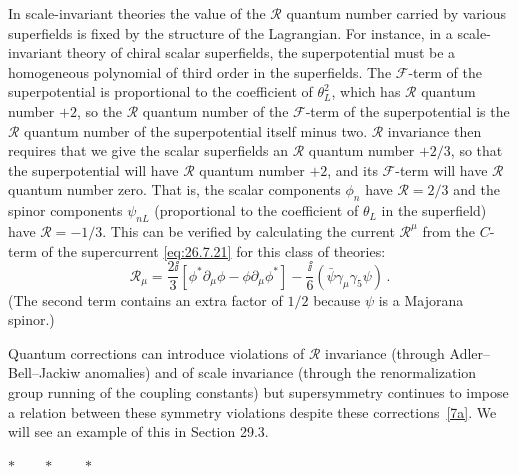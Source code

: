 In scale-invariant theories the value of the \(\mathcal{R}\) quantum number
carried by various superfields is fixed by the structure of the Lagrangian.
For instance, in a scale-invariant theory of chiral scalar superfields, the
superpotential must be a homogeneous polynomial of third order in the
superfields. The \(\mathcal{F}\)-term of the superpotential is proportional
to the coefficient of \(\theta_L^2\), which has \(\mathcal{R}\) quantum
number \(+2\), so the \(\mathcal{R}\) quantum number of the
\(\mathcal{F}\)-term of the superpotential is the \(\mathcal{R}\) quantum
number of the superpotential itself minus two. \(\mathcal{R}\) invariance
then requires that we give the scalar superfields an \(\mathcal{R}\) quantum
number \(+2/3\), so that the superpotential will have \(\mathcal{R}\)
quantum number \(+2\), and its \(\mathcal{F}\)-term will have
\(\mathcal{R}\) quantum number zero. That is, the scalar components \(\phi_n\)
have \(\mathcal{R}=2/3\) and the spinor components \(\psi_{nL}\)
(proportional to the coefficient of \(\theta_L\) in the superfield) have
\(\mathcal{R}=-1/3\). This can be verified by calculating the current
\(\mathcal{R}^\mu\) from the \(C\)-term of the supercurrent
\eqref{eq:26.7.21} for this class of theories:
\begin{equation}
  \mathcal{R}_\mu
  =\frac{2\ii}{3}
    [\phi^*\partial_\mu\phi-\phi\partial_\mu\phi^*]
   -\frac{\ii}{6}(\bar\psi\gamma_\mu\gamma_5\psi)\,.
  \tag{26.7.52}\label{eq:26.7.52}
\end{equation}
(The second term contains an extra factor of \(1/2\) because \(\psi\) is a
Majorana spinor.)

Quantum corrections can introduce violations of \(\mathcal{R}\) invariance
(through Adler--Bell--Jackiw anomalies) and of scale invariance (through the
renormalization group running of the coupling constants) but supersymmetry
continues to impose a relation between these symmetry violations despite
these corrections~\hyperref[ch26-ref-7a]{[7a]}. We will see an example of
this in Section 29.3.

\begin{center}
\(\ast\qquad\ast\qquad\ast\)
\end{center}

